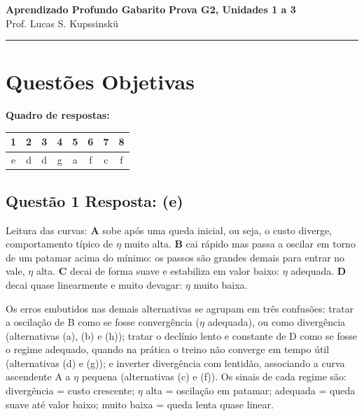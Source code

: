 \documentclass[11pt,a4paper]{article}
\begin{document}
{\Large\bfseries Aprendizado Profundo \textemdash{} Gabarito} \hfill \textbf{Prova G2, Unidades 1 a 3}\\
Prof. Lucas S. Kupssinskü

\rule{\linewidth}{0.8pt}

\section*{Questões Objetivas}

\textbf{Quadro de respostas:}
\begin{center}
\begin{tabular}{|c|c|c|c|c|c|c|c|}
\hline
1 & 2 & 3 & 4 & 5 & 6 & 7 & 8 \\\hline
e & d & d & g & a & f & c & f \\\hline
\end{tabular}
\end{center}

\color{blue}

\subsection*{Questão 1 \textemdash{} Resposta: (e)}
Leitura das curvas: \textbf{A} sobe após uma queda inicial, ou seja, o custo diverge, comportamento típico de $\eta$ muito alta. \textbf{B} cai rápido mas passa a oscilar em torno de um patamar acima do mínimo: os passos são grandes demais para entrar no vale, $\eta$ alta. \textbf{C} decai de forma suave e estabiliza em valor baixo: $\eta$ adequada. \textbf{D} decai quase linearmente e muito devagar: $\eta$ muito baixa.

Os erros embutidos nas demais alternativas se agrupam em três confusões: tratar a oscilação de B como se fosse convergência ($\eta$ adequada), ou como divergência (alternativas (a), (b) e (h)); tratar o declínio lento e constante de D como se fosse o regime adequado, quando na prática o treino não converge em tempo útil (alternativas (d) e (g)); e inverter divergência com lentidão, associando a curva ascendente A a $\eta$ pequena (alternativas (c) e (f)). Os sinais de cada regime são: divergência = custo crescente; $\eta$ alta = oscilação em patamar; adequada = queda suave até valor baixo; muito baixa = queda lenta quase linear.
\end{document}
